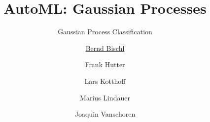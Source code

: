 



\newcommand{\lz}{\vspace{0.5cm}}
\newcommand{\thetab}{\bm{\weights}}
\newcommand{\zero}{\mathbf{0}}
\newcommand{\Xmat}{\mathbf{X}}
\newcommand{\ydat}{\mathbf{y}}
\newcommand{\id}{\boldsymbol{I}}
\newcommand{\Amat}{\mathbf{A}}
\newcommand{\Xspace}{\mathcal{X}}                                         
\newcommand{\Yspace}{\mathcal{Y}}
\newcommand{\ls}{\ell}
\newcommand{\natnum}{\mathbb{N}}
\newcommand{\intnum}{\mathbb{Z}}
\newcommand{\sumin}{\sum\limits_{i=1}^n}	

\usepackage{fontawesome}
\usepackage{dirtytalk}
\usepackage{csquotes}



\title[AutoML: GPs]{AutoML: Gaussian Processes} %
\subtitle{Gaussian Process Classification} %
\author[Marius Lindauer]{\underline{Bernd Bischl} \and Frank Hutter \and Lars Kotthoff\newline \and Marius Lindauer \and Joaquin Vanschoren}
\institute{}
\date{}





\maketitle



